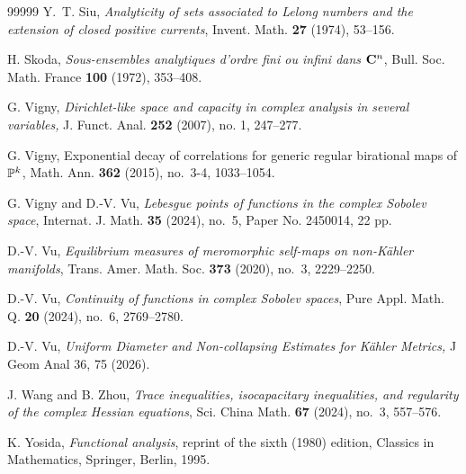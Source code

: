 \documentclass{amsart}
\theoremstyle{definition}
\numberwithin{thm}{section}
\numberwithin{equation}{section}
\renewcommand{\[}{\begin{equation}}
\renewcommand{\]}{\end{equation}}
\begin{document}
\begin{thebibliography}{99999}
Y.~T. Siu, {\it Analyticity of sets associated to Lelong numbers and the extension of closed positive currents}, Invent. Math. {\bf 27} (1974), 53--156.

H. Skoda, {\it Sous-ensembles analytiques d'ordre fini ou infini dans ${\bf C}\sp{n}$}, Bull. Soc. Math. France {\bf 100} (1972), 353--408.


 G. Vigny, {\it Dirichlet-like space and capacity in complex analysis in several variables,} J. Funct. Anal. {\bf 252} (2007), no. 1, 247--277.

G. Vigny, Exponential decay of correlations for generic regular birational maps of $\Bbb{P}^k$, Math. Ann. {\bf 362} (2015), no.~3-4, 1033--1054.

G. Vigny and D.-V. Vu, {\it Lebesgue points of functions in the complex Sobolev space}, Internat. J. Math. {\bf 35} (2024), no.~5, Paper No. 2450014, 22 pp.


D.-V. Vu, {\it Equilibrium measures of meromorphic self-maps on non-K\"ahler manifolds}, Trans. Amer. Math. Soc. {\bf 373} (2020), no.~3, 2229--2250.

D.-V. Vu, {\it Continuity of functions in complex Sobolev spaces}, Pure Appl. Math. Q. {\bf 20} (2024), no.~6, 2769--2780.

 D.-V. Vu, {\it Uniform Diameter and Non-collapsing Estimates for Kähler Metrics,} J Geom Anal 36, 75 (2026). 

J. Wang and B. Zhou, {\it Trace inequalities, isocapacitary inequalities, and regularity of the complex Hessian equations}, Sci. China Math. {\bf 67} (2024), no.~3, 557--576.

K. Yosida, {\it Functional analysis}, reprint of the sixth (1980) edition, 
Classics in Mathematics, Springer, Berlin, 1995.
\end{thebibliography}
\end{document}
